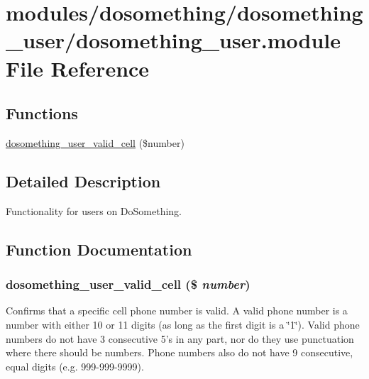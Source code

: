 \hypertarget{dosomething__user_8module}{
\section{modules/dosomething/dosomething\_\-user/dosomething\_\-user.module File Reference}
\label{dosomething__user_8module}
}
\subsection*{Functions}
\begin{DoxyCompactItemize}
\item 
\hyperlink{dosomething__user_8module_ae2ee3bafb69f17cb8cc4014d22f155c2}{dosomething\_\-user\_\-valid\_\-cell} (\$number)
\end{DoxyCompactItemize}


\subsection{Detailed Description}
Functionality for users on DoSomething. 

\subsection{Function Documentation}
\hypertarget{dosomething__user_8module_ae2ee3bafb69f17cb8cc4014d22f155c2}{
\subsubsection[{dosomething\_\-user\_\-valid\_\-cell}]{\setlength{\rightskip}{0pt plus 5cm}dosomething\_\-user\_\-valid\_\-cell (\$ {\em number})}}
\label{dosomething__user_8module_ae2ee3bafb69f17cb8cc4014d22f155c2}
Confirms that a specific cell phone number is valid. A valid phone number is a number with either 10 or 11 digits (as long as the first digit is a \char`\"{}1\char`\"{}). Valid phone numbers do not have 3 consecutive 5's in any part, nor do they use punctuation where there should be numbers. Phone numbers also do not have 9 consecutive, equal digits (e.g. 999-\/999-\/9999).


